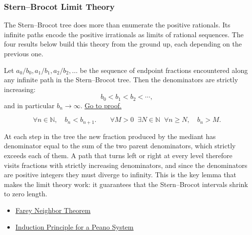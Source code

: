 
\subsubsection*{Stern--Brocot Limit Theory}
\label{sec:stern-brocot-limit-theory}

\begin{remark*}
The Stern--Brocot tree does more than enumerate the positive rationals.
Its infinite paths encode the positive irrationals as limits of rational
sequences.  The four results below build this theory from the ground up,
each depending on the previous one.
\end{remark*}

\begin{lemma}
\label{lem:sb-denom-growth}
Let $a_0/b_0, a_1/b_1, a_2/b_2, \ldots$ be the sequence of endpoint
fractions encountered along any infinite path in the Stern--Brocot tree.
Then the denominators are strictly increasing:
\[
b_0 < b_1 < b_2 < \cdots,
\]
and in particular $b_n \to \infty$.
\hyperref[prf:sb-denom-growth]{Go to proof.}
\end{lemma}

\begin{remark*}
\[
\forall n \in \mathbb{N},\quad b_n < b_{n+1}.
\qquad
\forall M > 0\;\; \exists N \in \mathbb{N}\;\; \forall n \geq N,\quad b_n > M.
\]
\end{remark*}

\begin{remark*}[Interpretation]
At each step in the tree the new fraction produced by the mediant has
denominator equal to the sum of the two parent denominators, which
strictly exceeds each of them.  A path that turns left or right at every
level therefore visits fractions with strictly increasing denominators,
and since the denominators are positive integers they must diverge to
infinity.  This is the key lemma that makes the limit theory work: it
guarantees that the Stern--Brocot intervals shrink to zero length.
\end{remark*}

\begin{dependencies}
\begin{itemize}
  \item \hyperref[thm:farey-neighbor-theorem]{Farey Neighbor Theorem}
  \item \hyperref[thm:induction-principle-for-peano-system]{Induction Principle for a Peano System}
\end{itemize}
\end{dependencies}

